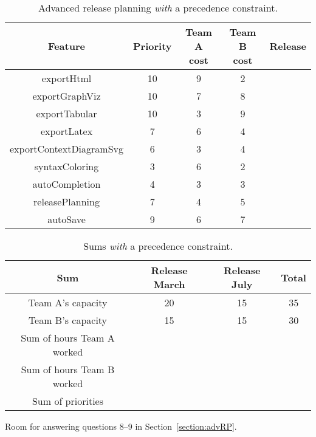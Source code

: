 \documentclass[11pt]{article}
\begin{document}
\clearpage\newpage
\begin{table}[ht]
\caption{Advanced release planning {\it with} a precedence constraint.}
\centering
\begin{tabular}{|c |  c | c | c| p{15mm} |}
\hline
Feature &  Priority & \parbox[t]{14mm}{Team A \\ cost\\}  & \parbox[t]{14mm}{Team B \\ cost} & Release \\
\hline
\hline exportHtml &  10 & 9 & 2 & \\
\hline exportGraphViz   & 10 & 7 & 8 & \\ 
\hline exportTabular & 10 & 3 & 9 &\\
\hline exportLatex & 7 & 6 & 4 &\\
\hline exportContextDiagramSvg  & 6 & 3 & 4 &\\
\hline syntaxColoring  & 3 & 6 & 2 &\\
\hline autoCompletion & 4 & 3 & 3 &\\
\hline releasePlanning    & 7 & 4 & 5 &\\
\hline autoSave  & 9 & 6 & 7 &\\ 
\hline
\end{tabular}
\label{advPlan2}
\end{table}

\begin{table}[ht]
\caption{Sums {\it with} a precedence constraint.}
\centering
\begin{tabular}{| c | c | c | c |}
\hline
Sum & Release March & Release July & \parbox[t]{14mm}{Total \\} \\ 
\hline
\hline Team A's capacity & 20 & 15 & 35\\ 
\hline Team B's capacity & 15 & 15 & 30 \\
\hline Sum of hours Team A worked & & & \\
\hline Sum of hours Team B worked & & & \\
\hline Sum of priorities & & & \\
\hline
\end{tabular}
\label{advSum2}
\end{table}

\begin{framed}
\noindent Room for answering questions 8--9 in Section~\ref{section:advRP}.
\vspace{5.5cm}
\end{framed}
\end{document}

